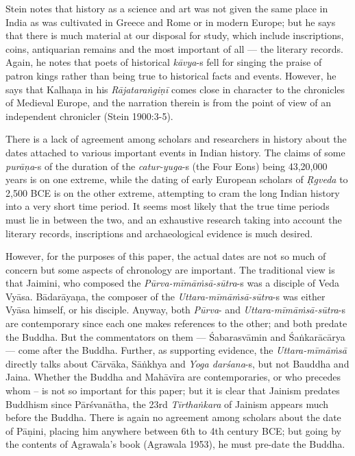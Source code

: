 Stein notes that history as a science and art was not given the same place in India as was cultivated in Greece and Rome or in modern Europe; but he says that there is much material at our disposal for study, which include inscriptions, coins, antiquarian remains and the most important of all — the literary records. Again, he notes that poets of historical \textit{kāvya}-s fell for singing the praise of patron kings rather than being true to historical facts and events. However, he says that Kalhaṇa in his \textit{Rājataraṅgiṇī} comes close in character to the chronicles of Medieval Europe, and the narration therein is from the point of view of an independent chronicler (Stein 1900:3-5).

There is a lack of agreement among scholars and researchers in history about the dates attached to various important events in Indian history. The claims of some \textit{purāṇa}-s of the duration of the \textit{catur-yuga}-s (the Four Eons) being 43,20,000 years is on one extreme, while the dating of early European scholars of \textit{Ṛgveda} to 2,500 BCE is on the other extreme, attempting to cram the long Indian history into a very short time period. It seems most likely that the true time periods must lie in between the two, and an exhaustive research taking into account the literary records, inscriptions and archaeological evidence is much desired.

However, for the purposes of this paper, the actual dates are not so much of concern but some aspects of chronology are important. The traditional view is that Jaimini, who composed the \textit{Pūrva-mīmāṁsā-sūtra}-s was a disciple of Veda Vyāsa. Bādarāyaṇa, the composer of the \textit{Uttara-mīmāṁsā-sūtra}-s was either Vyāsa himself, or his disciple. Anyway, both \textit{Pūrva}- and \textit{Uttara-mīmāṁsā-sūtra}-s are contemporary since each one makes references to the other; and both predate the Buddha. But the commentators on them — Śabarasvāmin and Śaṅkarācārya — come after the Buddha. Further, as supporting evidence, the \textit{Uttara-mīmāṁsā} directly talks about Cārvāka, Sāṅkhya and \textit{Yoga darśana}-s, but not Bauddha and Jaina. Whether the Buddha and Mahāvīra are contemporaries, or who precedes whom – is not so important for this paper; but it is clear that Jainism predates Buddhism since Pārśvanātha, the 23rd \textit{Tīrthaṅkara} of Jainism appears much before the Buddha. There is again no agreement among scholars about the date of Pāṇini, placing him anywhere between 6th to 4th century BCE; but going by the contents of Agrawala’s book (Agrawala 1953), he must pre-date the Buddha.

